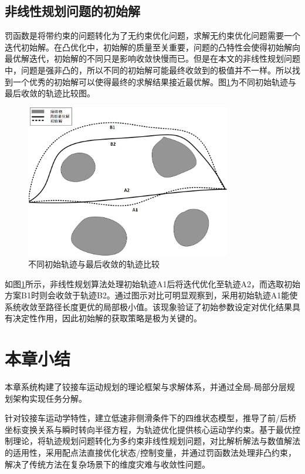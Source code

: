 \documentclass[master,academic]{ysuthesis} %
\begin{document}
		\subsection{非线性规划问题的初始解}
		罚函数是将带约束的问题转化为了无约束优化问题，求解无约束优化问题需要一个迭代初始解。在凸优化中，初始解的质量至关重要，问题的凸特性会使得初始解向最优解迭代，初始解的不同只是影响收敛快慢而已。但是在本文的非线性规划问题中，问题是强非凸的，所以不同的初始解可能最终收敛到的极值并不一样。所以找到一个优秀的初始解可以使得最终的求解结果接近最优解。图\ref{fig:不同初解}为不同初始轨迹与最后收敛的轨迹比较图。
		\begin{figure}[!ht]
			\centering
			\includegraphics[width=0.8\textwidth]{不同初解.png}
			\caption{不同初始轨迹与最后收敛的轨迹比较}
			\label{fig:不同初解}
		\end{figure}
		如图\ref{fig:不同初解}所示，非线性规划算法处理初始轨迹A1后将迭代优化至轨迹A2，而选取初始方案B1时则会收敛于轨迹B2。通过图示对比可明显观察到，采用初始轨迹A1能使系统收敛至路径长度更优的局部极小值。该现象验证了初始参数设定对优化结果具有决定性作用，因此初始解的获取策略是极为关键的。

	\section{本章小结}
	本章系统构建了铰接车运动规划的理论框架与求解体系，并通过全局-局部分层规划架构实现任务分解。

	针对铰接车运动学特性，建立低速非侧滑条件下的四维状态模型，推导了前/后桥坐标变换关系与瞬时转向半径方程，为轨迹优化提供核心运动学约束。基于最优控制理论，将轨迹规划问题转化为多约束非线性规划问题，对比解析解法与数值解法的适用性，采用配点法直接优化状态/控制变量，并通过罚函数法处理非凸约束，解决了传统方法在复杂场景下的维度灾难与收敛性问题。
\end{document}
